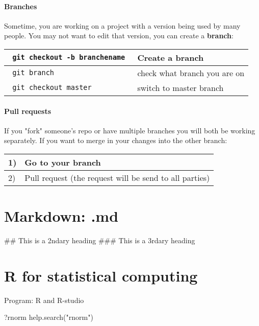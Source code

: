 \documentclass[a4paper,12pt]{report}
\newcommand{\code}[1]{\texttt{#1} }
\begin{document}
\subsection{Branches}
Sometime, you are working on a project with a version being used by many people. You may not want to edit that version, you can create a \textbf{branch}: \\
\begin{table}[H]
\centering
\begin{tabular}{|l|l|}
  \hline 
\code{ \textcolor[rgb]{0,0,1}{git} checkout \textcolor[rgb]{1,0,0}{-b} \textcolor[rgb]{0.24,0.7,0.44}{branchename} }  & Create a branch \\
\hline
\code{ \textcolor[rgb]{0,0,1}{git} branch }  & check what branch you are on \\
\hline
\code{ \textcolor[rgb]{0,0,1}{git} checkout \textcolor[rgb]{0.24,0.7,0.44}{master} }  & switch to master branch \\
\hline
\end{tabular}
\end{table}
\subsection{Pull requests}
If you "fork" someone's repo or have multiple branches you will both be working separately. If you want to merge in your changes into the other branch: 
\begin{table}[H]
\centering
\begin{tabular}{|l|l|}
  \hline 
1) & Go to your branch \\
\hline
2) & Pull request (the request will be send to all parties) \\
  \hline 
\end{tabular}
\end{table}
\part{Markdown: .md}

\begin{tcolorbox}
\begin{python}
## This is a 2ndary heading
### This is a 3rdary heading
\end{python}
\end{tcolorbox}

\part{R for statistical computing}
Program: R and R-studio
\begin{tcolorbox}
\begin{python}
?rnorm  %
help.search("rnorm") %
\end{python}
\end{tcolorbox}
\end{document}
